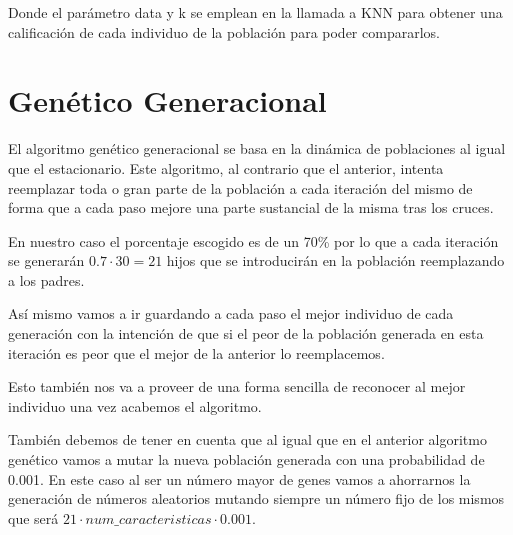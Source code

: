 \documentclass[12pt,a4paper]{article}
\begin{document}
	Donde el parámetro data y k se emplean en la llamada a KNN para obtener una calificación de cada individuo de la población para poder compararlos.
	
	\section{Genético Generacional}
	\label{sec:GG}
	
	El algoritmo genético generacional se basa en la dinámica de poblaciones al igual que el estacionario. Este algoritmo, al contrario que el anterior, intenta reemplazar toda o gran parte de la población a cada iteración del mismo de forma que a cada paso mejore una parte sustancial de la misma tras los cruces.
	
	En nuestro caso el porcentaje escogido es de un 70\% por lo que a cada iteración se generarán $0.7\cdot 30 = 21$ hijos que se introducirán en la población reemplazando a los padres.
	
	Así mismo vamos a ir guardando a cada paso el mejor individuo de cada generación con la intención de que si el peor de la población generada en esta iteración es peor que el mejor de la anterior lo reemplacemos.
	
	Esto también nos va a proveer de una forma sencilla de reconocer al mejor individuo una vez acabemos el algoritmo.
	
	También debemos de tener en cuenta que al igual que en el anterior algoritmo genético vamos a mutar la nueva población generada con una probabilidad de 0.001. En este caso al ser un número mayor de genes vamos a ahorrarnos la generación de números aleatorios mutando siempre un número fijo de los mismos que será $21\cdot num\_caracteristicas\cdot 0.001$.
	
\end{document}
